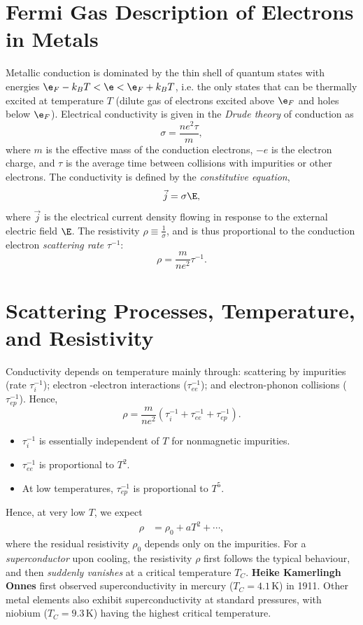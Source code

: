 \documentclass[a4paper, 11pt, normalem]{report}
\begin{document}
\section{Fermi Gas Description of Electrons in Metals}
Metallic conduction is dominated by the thin shell of quantum states with energies $\e_F-k_BT<\e<\e_F+k_BT$, i.e. the only states that can be thermally excited at temperature $T$ (dilute gas of electrons excited above $\e_F$ and holes below $\e_F$).
Electrical conductivity is given in the \emph{Drude theory} of conduction as
\begin{equation}
    \sigma=\frac{ne^2\tau}{m},
\end{equation}
where $m$ is the effective mass of the conduction electrons, $-e$ is the electron charge, and $\tau$ is the average time between collisions with impurities or other electrons.
The conductivity is defined by the \emph{constitutive equation},
\begin{equation}
    \vec{j}=\sigma\E,
\end{equation}
where $\vec{j}$ is the electrical current density flowing in response to the external electric field $\E$.
The resistivity $\rho\equiv\frac{1}{\sigma}$, and is thus proportional to the conduction electron \emph{scattering rate} $\tau^{-1}$:
\begin{equation}
    \rho = \frac{m}{ne^2}\tau^{-1}.
\end{equation}

\section{Scattering Processes, Temperature, and Resistivity}
Conductivity depends on temperature mainly through: scattering by impurities (rate $\tau_i^{-1}$); electron -electron interactions ($\tau_{ee}^{-1}$); and electron-phonon collisions ($\tau_{ep}^{-1}$).
Hence,
\begin{equation}
    \rho = \frac{m}{ne^2}\left(\tau_i^{-1}+\tau_{ee}^{-1}+\tau_{ep}^{-1}\right).
\end{equation}
\begin{itemize}
    \item $\tau_i^{-1}$ is essentially independent of $T$ for nonmagnetic impurities.
    \item $\tau_{ee}^{-1}$ is proportional to $T^2$.
    \item At low temperatures, $\tau_{ep}^{-1}$ is proportional to $T^5$.
\end{itemize}
Hence, at very low $T$, we expect
\begin{align}
    \rho &= \rho_0 + aT^2 + \cdots,
\end{align}
where the residual resistivity $\rho_0$ depends only on the impurities.
For a \emph{superconductor} upon cooling, the resistivity $\rho$ first follows the typical behaviour, and then \emph{suddenly vanishes} at a critical temperature $T_C$.
\textbf{Heike Kamerlingh Onnes} first observed superconductivity in mercury ($T_C=4.1\,$K) in 1911.
Other metal elements also exhibit superconductivity at standard pressures, with niobium ($T_C=9.3\,$K) having the highest critical temperature.
\end{document}
